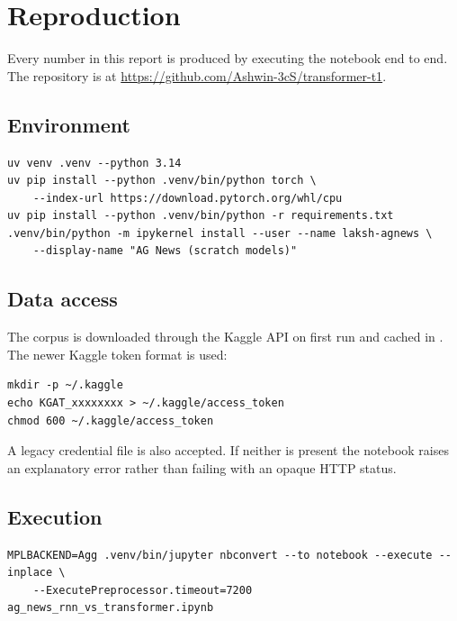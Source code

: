 \appendix

\chapter{Reproduction}
\label{app:repro}

Every number in this report is produced by executing the notebook
 end to end. The repository is at
\url{https://github.com/Ashwin-3cS/transformer-t1}.

\section{Environment}

{\small
\begin{verbatim}
uv venv .venv --python 3.14
uv pip install --python .venv/bin/python torch \
    --index-url https://download.pytorch.org/whl/cpu
uv pip install --python .venv/bin/python -r requirements.txt
.venv/bin/python -m ipykernel install --user --name laksh-agnews \
    --display-name "AG News (scratch models)"
\end{verbatim}}

\section{Data access}

The corpus is downloaded through the Kaggle API on first run and cached in .
The newer Kaggle token format is used:

{\small
\begin{verbatim}
mkdir -p ~/.kaggle
echo KGAT_xxxxxxxx > ~/.kaggle/access_token
chmod 600 ~/.kaggle/access_token
\end{verbatim}}

A legacy  credential file is also accepted. If neither is present the
notebook raises an explanatory error rather than failing with an opaque HTTP status.

\section{Execution}

{\small
\begin{verbatim}
MPLBACKEND=Agg .venv/bin/jupyter nbconvert --to notebook --execute --inplace \
    --ExecutePreprocessor.timeout=7200 ag_news_rnn_vs_transformer.ipynb
\end{verbatim}}

